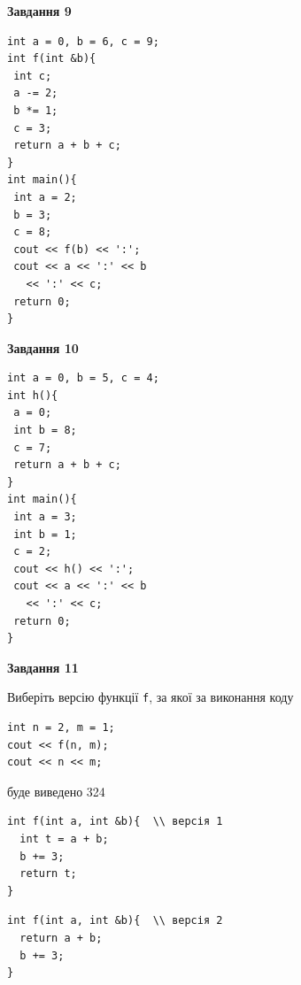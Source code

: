 \documentclass[12pt, ukrainian]{article}
\def\code#1{\Verb!#1!}
\begin{document}
{\begin {large}
\begin{minipage}[t]{11.0cm}
\end{minipage}


\begin{minipage}[t]{7.0cm}

\begin{center}
\textbf{Завдання 9}
\end{center}
\vspace{-8mm}

\begin{verbatim}
int a = 0, b = 6, c = 9;
int f(int &b){
 int c;
 a -= 2;
 b *= 1;
 c = 3;
 return a + b + c;
}
int main(){
 int a = 2;
 b = 3;
 c = 8;
 cout << f(b) << ':';
 cout << a << ':' << b 
   << ':' << c;
 return 0;
}
\end{verbatim}



\begin{center}
\textbf{Завдання 10}
\end{center}
\vspace{-8mm}

\begin{verbatim}
int a = 0, b = 5, c = 4;
int h(){
 a = 0;
 int b = 8;
 c = 7;
 return a + b + c;
}
int main(){
 int a = 3;
 int b = 1;
 c = 2;
 cout << h() << ':';
 cout << a << ':' << b 
   << ':' << c;
 return 0;
}
\end{verbatim}

\end{minipage}
\vline \hspace{1mm}
\begin{minipage}[t]{11.0cm}

\begin{center}
\textbf{Завдання 11}
\end{center}
Виберіть версію функції \code{f}, за якої за виконання коду
\begin{verbatim}
int n = 2, m = 1;
cout << f(n, m);
cout << n << m;
\end{verbatim}

буде виведено 324

\begin{verbatim}
int f(int a, int &b){  \\ версія 1
  int t = a + b;
  b += 3;
  return t;
}
\end{verbatim}

\vspace{-8mm}\begin{verbatim}
int f(int a, int &b){  \\ версія 2
  return a + b;
  b += 3;
}
\end{verbatim}


\end{minipage}
\end{large}}
\end{document}
